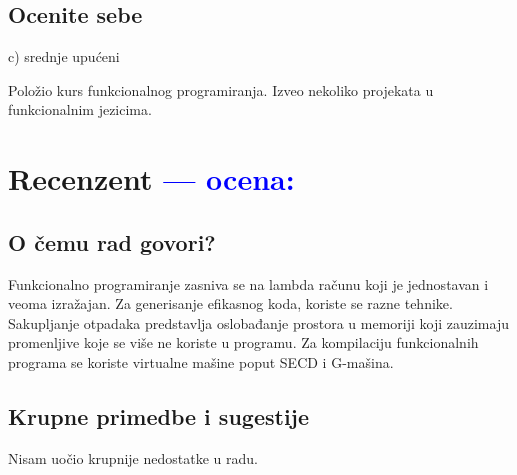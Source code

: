 \documentclass[a4paper]{report}
\newcommand{\odgovor}[1]{\textcolor{blue}{#1}}
\begin{document}
\section{Ocenite sebe}
c) srednje upućeni


Položio kurs funkcionalnog programiranja. Izveo nekoliko projekata u funkcionalnim jezicima.

\chapter{Recenzent \odgovor{--- ocena:} }


\section{O čemu rad govori?}
Funkcionalno programiranje zasniva se na lambda računu koji je jednostavan i veoma izražajan.  Za generisanje efikasnog koda, koriste se razne tehnike. Sakupljanje otpadaka predstavlja oslobađanje prostora u memoriji koji zauzimaju promenljive koje se više ne koriste u programu. Za kompilaciju funkcionalnih programa se koriste virtualne mašine poput SECD i G-mašina.

\section{Krupne primedbe i sugestije}
Nisam uočio krupnije nedostatke u radu.
\end{document}
